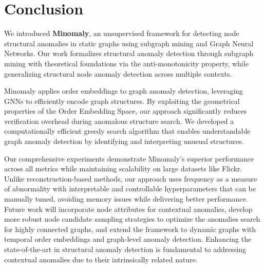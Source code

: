 \documentclass[pdflatex,sn-mathphys-num]{sn-jnl}%
\theoremstyle{thmstyleone}%
\theoremstyle{thmstyletwo}%
\theoremstyle{thmstylethree}%
\begin{document}
\section{Conclusion}
\label{sec:conclusion}

We introduced \textbf{Minomaly}, an unsupervised framework for detecting node structural anomalies in static graphs using subgraph mining and Graph Neural Networks. Our work formalizes structural anomaly detection through subgraph mining with theoretical foundations via the anti-monotonicity property, while generalizing structural node anomaly detection across multiple contexts.

Minomaly applies order embeddings to graph anomaly detection, leveraging GNNs to efficiently encode graph structures. By exploiting the geometrical properties of the Order Embedding Space, our approach significantly reduces verification overhead during anomalous structure search. We developed a computationally efficient greedy search algorithm that enables understandable graph anomaly detection by identifying and interpreting unusual structures.

Our comprehensive experiments demonstrate Minomaly's superior performance across all metrics while maintaining scalability on large datasets like Flickr. Unlike reconstruction-based methods, our approach uses frequency as a measure of abnormality with interpretable and controllable hyperparameters that can be manually tuned, avoiding memory issues while delivering better performance. Future work will incorporate node attributes for contextual anomalies, develop more robust node candidate sampling strategies to optimize the anomalies search for highly connected graphs, and extend the framework to dynamic graphs with temporal order embeddings and graph-level anomaly detection. Enhancing the state-of-the-art in structural anomaly detection is fundamental to addressing contextual anomalies due to their intrinsically related nature.


\end{document}
